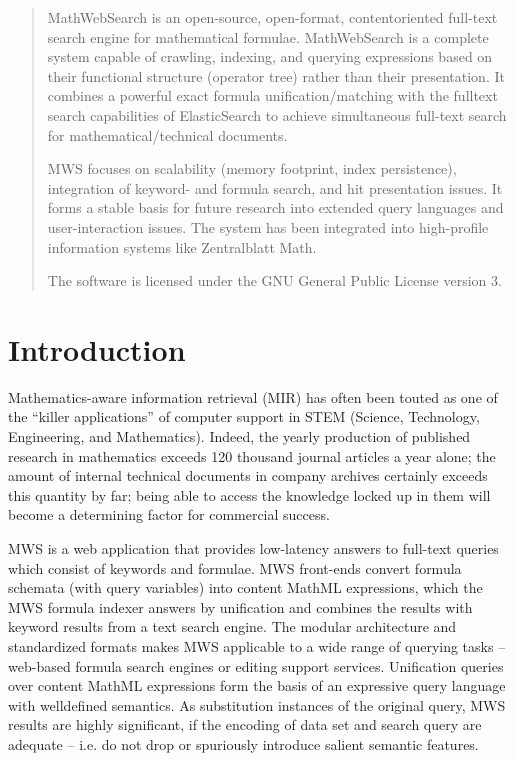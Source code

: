 \documentclass{deliverablereport}
\author{Michael Kohlhase \& Alexandru Glontaru}
\begin{document}
\maketitle
\begin{abstract}
MathWebSearch is an open-source, open-format, contentoriented full-text search engine for mathematical formulae. MathWebSearch is a complete system capable of crawling, indexing, and querying expressions based on their functional structure (operator tree) rather than their presentation. It combines a powerful exact formula unification/matching with the fulltext search capabilities of ElasticSearch to achieve simultaneous full-text search for mathematical/technical documents. \par
MWS focuses on scalability (memory footprint, index persistence), integration of keyword- and formula search, and hit presentation issues. It forms a stable basis for future research into extended query languages and user-interaction issues. The system has been integrated into high-profile information systems like Zentralblatt Math. 
 
The software is licensed under the GNU General Public License version 3. 
 
 
\end{abstract}
\newpage\tableofcontents\listoffigures\newpage

\section{Introduction}\label{sec:intro}
Mathematics-aware information retrieval (MIR) has often been touted as one of the “killer
applications” of computer support in STEM (Science, Technology, Engineering, and
Mathematics). Indeed, the yearly production of published research in mathematics exceeds
120 thousand journal articles a year alone; the amount of internal technical documents in
company archives certainly exceeds this quantity by far; being able to access the
knowledge locked up in them will become a determining factor for commercial success.

MWS is a web application that provides low-latency answers to full-text queries which
consist of keywords and formulae. MWS front-ends convert formula schemata (with query
variables) into content MathML expressions, which the MWS formula indexer answers by
unification and combines the results with keyword results from a text search engine. The
modular architecture and standardized formats makes MWS applicable to a wide range of
querying tasks – web-based formula search engines or editing support services. Unification
queries over content MathML expressions form the basis of an expressive query language
with welldefined semantics. As substitution instances of the original query, MWS results
are highly significant, if the encoding of data set and search query are adequate –
i.e. do not drop or spuriously introduce salient semantic features.
\end{document}
